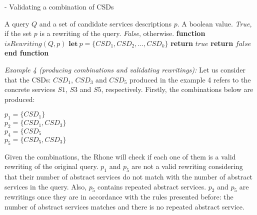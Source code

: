 \begin{algorithm}
\caption{ - Validating a combination of CSDs}
\label{isrewriting}
\begin{algorithmic}[1]
\REQUIRE A query $Q$ and a set of candidate services descriptions $p$.
\ENSURE A boolean value. \textit{True}, if the set $p$ is a rewriting of the query. \textit{False}, otherwise.
\STATE \textbf{function} $\mathit{isRewriting} (Q, p)$
\STATE  $\mathbf{let} \ p = \lbrace CSD_{1}, CSD_{2}, ..., CSD_{k} \rbrace$
	\STATE \textbf{return} $true$		
\ENDIF
\STATE \textbf{return} $false$
\STATE \textbf{end function}
\end{algorithmic}
\end{algorithm}

\bigskip
\noindent \textit{Example 4 (producing combinations and validating rewritings):} 
Let us consider that the CSDs: $CSD_{1}$, $CSD_{3}$ and $CSD_{5}$ produced in the example 4 
refers to the concrete services $S1$, $S3$ and $S5$, respectively. 
Firstly, the combinations below are produced:
\begin{flushleft}
$p_{1} = \lbrace CSD_{1} \rbrace$ \\
$p_{2} = \lbrace CSD_{1}, CSD_{3} \rbrace$ \\
$p_{4} = \lbrace CSD_{5}$ \\
$p_{5} = \lbrace CSD_{5}, CSD_{3} \rbrace$ 
\end{flushleft}
Given the combinations, the Rhone will check if each one of them is a valid rewriting of 
the original query. $p_{1}$ and $p_{5}$ are not a valid rewriting considering that their number
of abstract services do not match with the number of abstract services in the query. Also, $p_{5}$
contains repeated abstract services. $p_{2}$ and $p_{5}$ are rewritings once they are in accordance
with the rules presented before: the number of abstract services matches and there is no repeated abstract 
service. 
